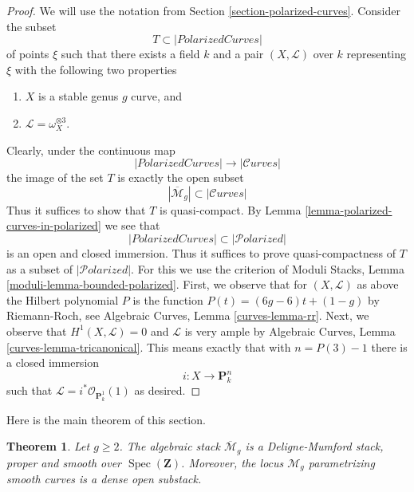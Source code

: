 \documentclass{stacks-project}
\theoremstyle{plain}
\newtheorem{theorem}[subsection]{Theorem}
\theoremstyle{definition}
\theoremstyle{remark}
\numberwithin{equation}{subsection}
\def\Spec{\mathop{\mathrm{Spec}}}
\def\Curvesstack{\mathcal{C}\!\mathit{urves}}
\def\Polarizedstack{\mathcal{P}\!\mathit{olarized}}
\begin{document}
\begin{proof}
We will use the notation from Section \ref{section-polarized-curves}.
Consider the subset
$$
T \subset |\textit{PolarizedCurves}|
$$
of points $\xi$ such that there exists a field $k$ and a pair
$(X, \mathcal{L})$ over $k$ representing $\xi$
with the following two properties
\begin{enumerate}
\item $X$ is a stable genus $g$ curve, and
\item $\mathcal{L} = \omega_X^{\otimes 3}$.
\end{enumerate}
Clearly, under the continuous map
$$
|\textit{PolarizedCurves}|
\longrightarrow
|\Curvesstack|
$$
the image of the set $T$ is exactly the open subset
$$
|\overline{\mathcal{M}}_g| \subset |\Curvesstack|
$$
Thus it suffices to show that $T$ is quasi-compact.
By Lemma \ref{lemma-polarized-curves-in-polarized} we see that
$$
|\textit{PolarizedCurves}| \subset |\Polarizedstack|
$$
is an open and closed immersion. Thus it suffices to
prove quasi-compactness of $T$ as a subset of
$|\Polarizedstack|$. For this we use the criterion of
Moduli Stacks, Lemma \ref{moduli-lemma-bounded-polarized}.
First, we observe that for $(X, \mathcal{L})$
as above the Hilbert polynomial $P$ is the function
$P(t) = (6g - 6)t + (1 - g)$ by Riemann-Roch, see
Algebraic Curves, Lemma \ref{curves-lemma-rr}.
Next, we observe that $H^1(X, \mathcal{L}) = 0$
and $\mathcal{L}$ is very ample by
Algebraic Curves, Lemma \ref{curves-lemma-tricanonical}.
This means exactly that with $n = P(3) - 1$
there is a closed immersion
$$
i : X \longrightarrow \mathbf{P}^n_k
$$
such that $\mathcal{L} = i^*\mathcal{O}_{\mathbf{P}^1_k}(1)$
as desired.
\end{proof}

\noindent
Here is the main theorem of this section.

\begin{theorem}
\label{theorem-stable-smooth-proper}
Let $g \geq 2$. The algebraic stack $\overline{\mathcal{M}}_g$ is a
Deligne-Mumford stack, proper and smooth over $\Spec(\mathbf{Z})$.
Moreover, the locus $\mathcal{M}_g$ parametrizing smooth curves
is a dense open substack.
\end{theorem}
\end{document}
